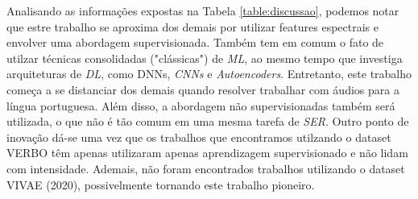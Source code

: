 Analisando as informações expostas na Tabela \ref{table:discussao}, podemos notar que estre trabalho se aproxima dos demais por utilizar features espectrais e envolver uma abordagem supervisionada. Também tem em comum o fato de utilzar técnicas consolidadas ("clássicas") de \textit{ML}, ao mesmo tempo que investiga arquiteturas de \textit{DL}, como DNNs, \textit{CNNs} e \textit{Autoencoders}. Entretanto, este trabalho começa a se distanciar dos demais quando resolver trabalhar com áudios para a língua portuguesa. Além disso, a abordagem não supervisionadas também será utilizada, o que não é tão comum em uma mesma tarefa de \textit{SER}. Outro ponto de inovação dá-se uma vez que os trabalhos que encontramos utilzando o dataset VERBO têm apenas utilizaram apenas aprendizagem supervisionado e não lidam com intensidade. Ademais, não foram encontrados trabalhos utilizando o dataset VIVAE (2020), possivelmente tornando este trabalho pioneiro.




